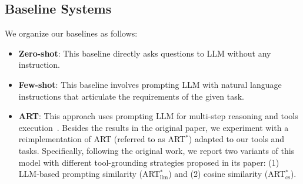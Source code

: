 \documentclass[11pt]{article}
\newcommand{\daniel}[1]{{\color{purple}[DK: #1]}}
\newcommand{\yining}[1]{{\color{ForestGreen}[YL: #1]}}
\newcommand{\llm}{\textcolor{darkredTwo}{LLM}}
\newcommand{\slm}{\textcolor{darkblueTwo}{SLM}}
\newcommand{\name}{{\fontfamily{cmss}\selectfont GEAR}}
\begin{document}



\label{subsec:systems}

\subsection{Baseline Systems}
We organize our baselines as follows:
\begin{itemize}[leftmargin=0.1in]
    \item \textbf{Zero-shot}: This baseline directly asks questions to \llm{} without any instruction.
    \item \textbf{Few-shot}: This baseline involves prompting \llm{} with natural language instructions that articulate the requirements of the given task.
    \item \textbf{ART}: This approach uses prompting \llm{} for multi-step reasoning and tools execution~\cite{paranjape2023art}. Besides the results in the original paper, we experiment with a reimplementation of ART (referred to as ART$^\ast$) adapted to our tools and tasks. 
    Specifically, following the original work, we report two variants of this model with different tool-grounding strategies proposed in its paper:  
    (1) \llm{}-based prompting similarity (ART$^\ast_{\text{llm}}$) 
    and (2) cosine similarity (ART$^\ast_{\text{cs}}$).
\end{itemize}
\end{document}
